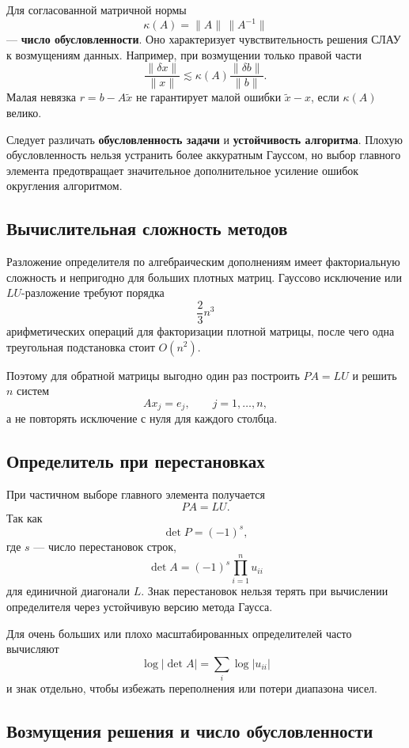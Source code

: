 Для согласованной матричной нормы
\[
\kappa(A)=\|A\|\,\|A^{-1}\|
\]
--- \textbf{число обусловленности}. Оно характеризует чувствительность решения СЛАУ к возмущениям данных. Например, при возмущении только правой части
\[
\frac{\|\delta x\|}{\|x\|}
\lesssim
\kappa(A)\frac{\|\delta b\|}{\|b\|}.
\]
Малая невязка $r=b-A\tilde x$ не гарантирует малой ошибки $\tilde x-x$, если $\kappa(A)$ велико.

Следует различать \textbf{обусловленность задачи} и \textbf{устойчивость алгоритма}. Плохую обусловленность нельзя устранить более аккуратным Гауссом, но выбор главного элемента предотвращает значительное дополнительное усиление ошибок округления алгоритмом.


\subsection{Вычислительная сложность методов}

Разложение определителя по алгебраическим дополнениям имеет факториальную
сложность и непригодно для больших плотных матриц. Гауссово исключение или
$LU$-разложение требуют порядка
\[
\frac{2}{3}n^3
\]
арифметических операций для факторизации плотной матрицы, после чего одна
треугольная подстановка стоит $O(n^2)$.

Поэтому для обратной матрицы выгодно один раз построить $PA=LU$ и решить
$n$ систем
\[
Ax_j=e_j,
\qquad j=1,\ldots,n,
\]
а не повторять исключение с нуля для каждого столбца.

\subsection{Определитель при перестановках}

При частичном выборе главного элемента получается
\[
PA=LU.
\]
Так как
\[
\det P=(-1)^s,
\]
где $s$ --- число перестановок строк,
\[
\boxed{
\det A=(-1)^s\prod_{i=1}^{n}u_{ii}}
\]
для единичной диагонали $L$. Знак перестановок нельзя терять при вычислении
определителя через устойчивую версию метода Гаусса.

Для очень больших или плохо масштабированных определителей часто вычисляют
\[
\log|\det A|=\sum_i\log|u_{ii}|
\]
и знак отдельно, чтобы избежать переполнения или потери диапазона чисел.

\subsection{Возмущения решения и число обусловленности}

